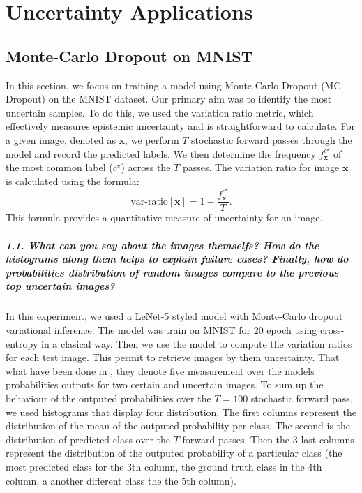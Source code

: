 \graphicspath{{figs/3c}}

\chapter{Uncertainty Applications}


\section{Monte-Carlo Dropout on MNIST}
In this section, we focus on training a model using Monte Carlo Dropout (MC Dropout) on the MNIST dataset. Our primary aim was to identify the most uncertain samples. To do this, we used the variation ratio metric, which effectively measures epistemic uncertainty and is straightforward to calculate. For a given image, denoted as $ \mathbf{x} $, we perform $ T $ stochastic forward passes through the model and record the predicted labels. We then determine the frequency $ f^{c^\star }_\mathbf{x} $ of the most common label ($ c^\star $) across the $ T $ passes. The variation ratio for image $ \mathbf{x} $ is calculated using the formula:
\[
    \text{var-ratio}[\mathbf{x}] = 1 - \frac{f^{c^\star }_\mathbf{x}}{T}
.\]
This formula provides a quantitative measure of uncertainty for an image.

\paragraph*{1.1. What can you say about the images themselfs? How do the histograms along them helps to explain failure cases? Finally, how do probabilities distribution of random images compare to the previous top uncertain images?}

In this experiment, we used a LeNet-5 styled model with Monte-Carlo dropout variational inference. The model was train on MNIST for 20 epoch using cross-entropy in a clasical way. Then we use the model to compute the variation ratios for each test image. This permit to retrieve images by them uncertainty. That what have been done in , they denote five measurement over the models probabilities outputs for two certain and uncertain images. To sum up the behaviour of the outputed probabilities over the $ T=100 $ stochastic forward pass, we used histograms that display four distribution.
The first columns represent the distribution of the mean of the outputed probability per class.
The second is the distribution of predicted class over the $ T $ forward passes.
Then the 3 last columns represent the distribution of the outputed probability of a particular class (the most predicted class for the 3th column, the ground truth class in the 4th column, a another different class the the 5th column).

